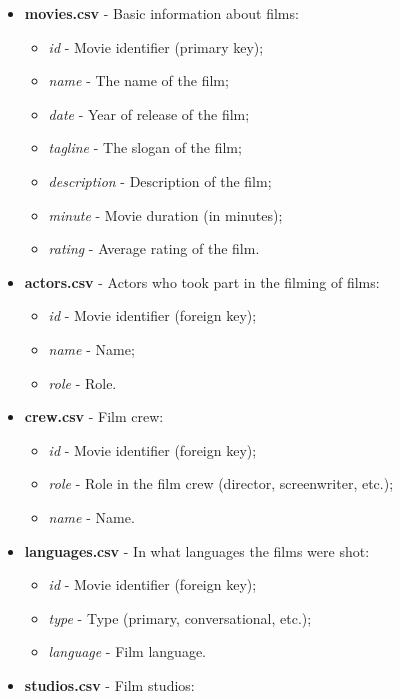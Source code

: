 \documentclass{Configuration_Files/PoliMi3i_thesis}
\begin{document}
\begin{itemize}
    \item \textbf{movies.csv} - Basic information about films:
    \begin{itemize}
        \item \textit{id} - Movie identifier (primary key);
        \item \textit{name} - The name of the film;
        \item \textit{date} - Year of release of the film;
        \item \textit{tagline} - The slogan of the film;
        \item \textit{description} - Description of the film;
        \item \textit{minute} - Movie duration (in minutes);
        \item \textit{rating} - Average rating of the film.
    \end{itemize}
    \item \textbf{actors.csv} - Actors who took part in the filming of films:
    \begin{itemize}
        \item \textit{id} - Movie identifier (foreign key);
        \item \textit{name} - Name;
        \item \textit{role} - Role.
    \end{itemize}
    \item \textbf{crew.csv} - Film crew:
    \begin{itemize}
        \item \textit{id} - Movie identifier (foreign key);
        \item \textit{role} - Role in the film crew (director, screenwriter, etc.);
        \item \textit{name} - Name.
    \end{itemize}
    \item \textbf{languages.csv} - In what languages the films were shot:
    \begin{itemize}
        \item \textit{id} - Movie identifier (foreign key);
        \item \textit{type} - Type (primary, conversational, etc.);
        \item \textit{language} - Film language.
    \end{itemize}
    \item \textbf{studios.csv} - Film studios:
    \begin{itemize}

\end{itemize}
\end{itemize}
\end{document}
